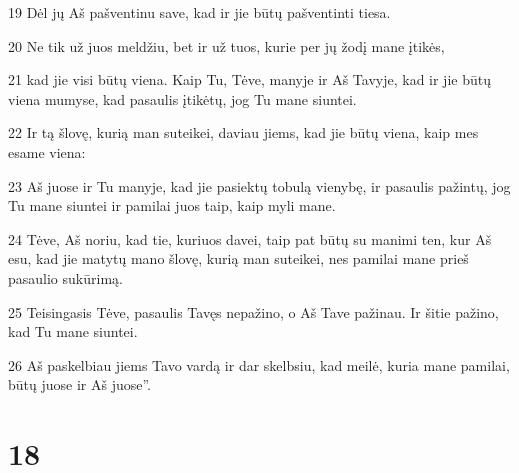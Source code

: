 \par 19 Dėl jų Aš pašventinu save, kad ir jie būtų pašventinti tiesa. 
\par 20 Ne tik už juos meldžiu, bet ir už tuos, kurie per jų žodį mane įtikės,­ 
\par 21 kad jie visi būtų viena. Kaip Tu, Tėve, manyje ir Aš Tavyje, kad ir jie būtų viena mumyse, kad pasaulis įtikėtų, jog Tu mane siuntei. 
\par 22 Ir tą šlovę, kurią man suteikei, daviau jiems, kad jie būtų viena, kaip mes esame viena: 
\par 23 Aš juose ir Tu manyje, kad jie pasiektų tobulą vienybę, ir pasaulis pažintų, jog Tu mane siuntei ir pamilai juos taip, kaip myli mane. 
\par 24 Tėve, Aš noriu, kad tie, kuriuos davei, taip pat būtų su manimi ten, kur Aš esu, kad jie matytų mano šlovę, kurią man suteikei, nes pamilai mane prieš pasaulio sukūrimą. 
\par 25 Teisingasis Tėve, pasaulis Tavęs nepažino, o Aš Tave pažinau. Ir šitie pažino, kad Tu mane siuntei. 
\par 26 Aš paskelbiau jiems Tavo vardą ir dar skelbsiu, kad meilė, kuria mane pamilai, būtų juose ir Aš juose”.


\chapter{18}


